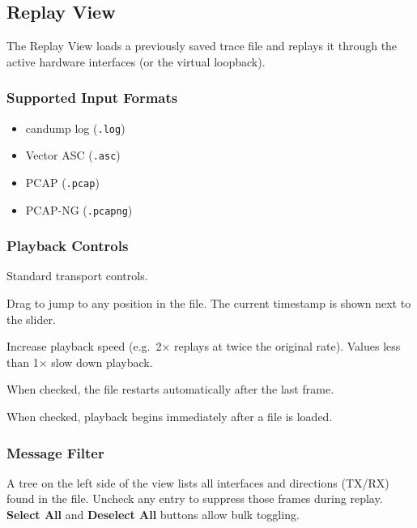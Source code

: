 \documentclass[a4paper,11pt]{article}
\newcommand{\ui}[1]{\textbf{#1}}
\newcommand{\file}[1]{\texttt{#1}}
\begin{document}
\subsection{Replay View}
\label{sec:replay}

The Replay View loads a previously saved trace file and replays it through the
active hardware interfaces (or the virtual loopback).

\subsubsection{Supported Input Formats}

\begin{itemize}
  \item candump log (\file{.log})
  \item Vector ASC (\file{.asc})
  \item PCAP (\file{.pcap})
  \item PCAP-NG (\file{.pcapng})
\end{itemize}

\subsubsection{Playback Controls}

\begin{description}[leftmargin=2em, style=nextline]
  \item[Play / Pause / Stop] Standard transport controls.
  \item[Seek slider] Drag to jump to any position in the file. The current
        timestamp is shown next to the slider.
  \item[Speed multiplier] Increase playback speed (e.g.\ 2× replays at twice
        the original rate). Values less than 1× slow down playback.
  \item[Loop] When checked, the file restarts automatically after the last frame.
  \item[Auto-play] When checked, playback begins immediately after a file is loaded.
\end{description}

\subsubsection{Message Filter}

A tree on the left side of the view lists all interfaces and directions (TX/RX)
found in the file. Uncheck any entry to suppress those frames during replay.
\ui{Select All} and \ui{Deselect All} buttons allow bulk toggling.
\end{document}
